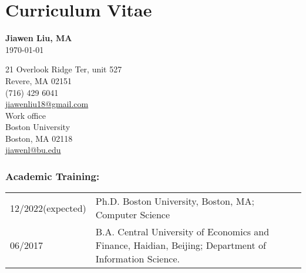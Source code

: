 \documentclass[12pt, letterpaper]{report}   %
\begin{document}


\chapter*{Curriculum Vitae}
\begin{large}
\begin{center}
\textbf{Jiawen Liu, MA}\\ 
\today\\
\end{center}
\end{large}

\setlength{\columnsep}{1.5in}
\begin{multicols}{1}{
\begin{center}{
21 Overlook Ridge Ter, unit 527 \\ Revere, MA 02151 \\ (716) 429 6041 \\ \hyperlink{mailto:personaladdress@gmail.com}{jiawenliu18@gmail.com}\\
Work office \\Boston University \\ Boston, MA 02118 \\\hyperlink{mailto:buemail@bu.edu}{jiawenl@bu.edu}\\}
\end{center}}
\end{multicols}

\subsection*{Academic Training:}
\begin{tabular}{p{}p{}}
12/2022\small(expected) &  Ph.D. Boston University, Boston, MA; Computer Science\\
06/2017  & B.A. Central University of Economics and Finance, Haidian, Beijing; Department of Information Science. \\
\end{tabular}
\end{document}

